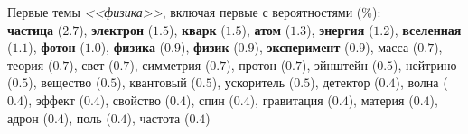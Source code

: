 \documentclass[a4paper,12pt]{article}
\begin{document}
  \noi
  Первые  темы \emph{<<физика>>}, включая первые  с вероятностями (\%):\\[0.2cm]
  \textbf{частица} (\emph{$2.7$}),
  \textbf{электрон} (\emph{$1.5$}),
  \textbf{кварк} (\emph{$1.5$}),
  \textbf{атом} (\emph{$1.3$}),
  \textbf{энергия} (\emph{$1.2$}),
  \textbf{вселенная} (\emph{$1.1$}),
  \textbf{фотон} (\emph{$1.0$}),
  \textbf{физика} (\emph{$0.9$}),
  \textbf{физик} (\emph{$0.9$}),
  \textbf{эксперимент} (\emph{$0.9$}),
  масса (\emph{$0.7$}),
  теория (\emph{$0.7$}),
  свет (\emph{$0.7$}),
  симметрия (\emph{$0.7$}),
  протон (\emph{$0.7$}),
  эйнштейн (\emph{$0.5$}),
  нейтрино (\emph{$0.5$}),
  вещество (\emph{$0.5$}),
  квантовый (\emph{$0.5$}),
  ускоритель (\emph{$0.5$}),
  детектор (\emph{$0.4$}),
  волна (\emph{$0.4$}),
  эффект (\emph{$0.4$}),
  свойство (\emph{$0.4$}),
  спин (\emph{$0.4$}),
  гравитация (\emph{$0.4$}),
  материя (\emph{$0.4$}),
  адрон (\emph{$0.4$}),
  поль (\emph{$0.4$}),
  частота (\emph{$0.4$})
\end{document}
